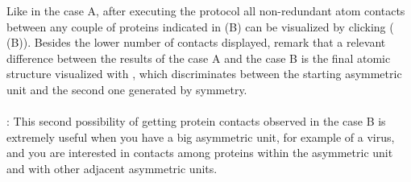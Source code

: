 \begin{itemize}
Like in the case A, after executing the protocol all non-redundant atom contacts between any couple of proteins indicated in  (B) can be visualized by clicking  ( (B)). Besides the lower number of contacts displayed, remark that a relevant difference between the results of the case A and the case B is the final atomic structure visualized with \chimera, which discriminates between the starting asymmetric unit and the second one generated by symmetry.\\
 
\\
: This second possibility of getting protein contacts observed in the case B is extremely useful when you have a big asymmetric unit, for example of a virus, and you are interested in contacts among proteins within the asymmetric unit and with other adjacent asymmetric units.
\end{itemize}
















